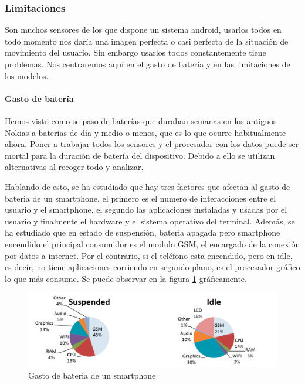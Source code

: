 \documentclass[12pt]{article}
\numberwithin{equation}{section}
\begin{document}
\subsubsection{Limitaciones}

Son muchos sensores de los que dispone un sistema android, usarlos todos en todo momento nos daría una imagen perfecta o casi perfecta de la situación de movimiento del usuario. Sin embargo usarlos todos constantemente tiene problemas. Nos centraremos aquí en el gasto de batería y en las limitaciones de los modelos.

\paragraph{Gasto de batería}
Hemos visto como se paso de baterías que duraban semanas en los antiguos Nokias a baterías de día y medio o menos, que es lo que ocurre habitualmente ahora. Poner a trabajar todos los sensores y el procesador con los datos puede ser mortal para la duración de batería del dispositivo. Debido a ello se utilizan alternativas al recoger todo y analizar. 

Hablando de esto, se ha estudiado que hay tres factores que afectan al gasto de bateria de un smartphone, el primero es el numero de interacciones entre el usuario y el smartphone, el segundo las aplicaciones instaladas y usadas por el usuario y finalmente el hardware y el sistema operativo del terminal\cite{Falaki:2010:DSU:1814433.1814453}. Además, se ha estudiado que en estado de suspensión, bateria apagada pero smartphone encendido el principal consumidor es el modulo GSM, el encargado de la conexión por datos a internet. Por el contrario, si el teléfono esta encendido, pero en idle, es decir, no tiene aplicaciones corriendo en segundo plano, es el procesador gráfico lo que más consume\cite{Carroll:2010:APC:1855840.1855861}. Se puede observar en la figura \ref{fig:consumo} gráficamente.
\begin{figure}[h]
    \centering
    \includegraphics[width=1\textwidth]{batterylife.png}
    \caption{Gasto de bateria de un smartphone\cite{Carroll:2010:APC:1855840.1855861}}
    \label{fig:consumo}
\end{figure}
\end{document}

